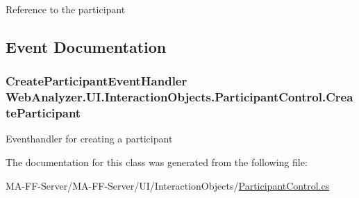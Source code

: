 Reference to the participant 



\subsection{Event Documentation}
\hypertarget{class_web_analyzer_1_1_u_i_1_1_interaction_objects_1_1_participant_control_a05567dca7355e947bf348985f4227d36}{}
\subsubsection[{Create\+Participant}]{\setlength{\rightskip}{0pt plus 5cm}Create\+Participant\+Event\+Handler Web\+Analyzer.\+U\+I.\+Interaction\+Objects.\+Participant\+Control.\+Create\+Participant}\label{class_web_analyzer_1_1_u_i_1_1_interaction_objects_1_1_participant_control_a05567dca7355e947bf348985f4227d36}


Eventhandler for creating a participant 



The documentation for this class was generated from the following file\+:\begin{DoxyCompactItemize}
\item 
M\+A-\/\+F\+F-\/\+Server/\+M\+A-\/\+F\+F-\/\+Server/\+U\+I/\+Interaction\+Objects/\hyperlink{_participant_control_8cs}{Participant\+Control.\+cs}\end{DoxyCompactItemize}
